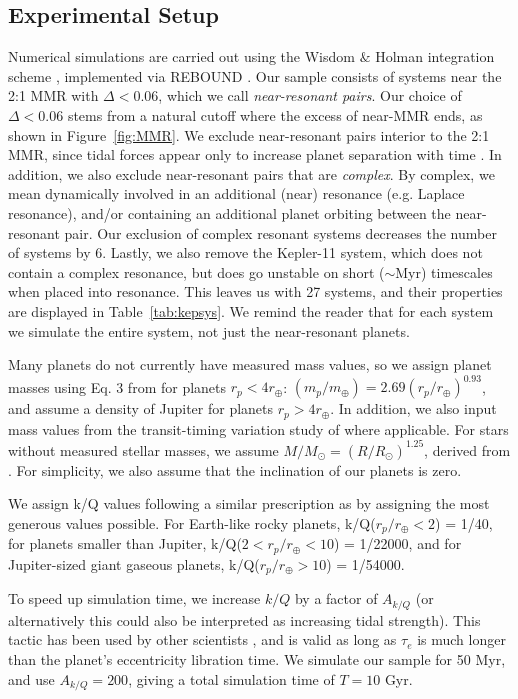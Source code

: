 \subsection{Experimental Setup}
\label{sec:expsetup}
Numerical simulations are carried out using the Wisdom $\& $ Holman integration scheme \citep{Wisdom1991}, implemented via REBOUND \citep{Rein2012}. 
Our sample consists of \kep{} systems near the 2:1 MMR with $\Delta < 0.06$, which we call \textit{near-resonant pairs}.
Our choice of $\Delta < 0.06$ stems from a natural cutoff where the excess of near-MMR ends, as shown in Figure~\ref{fig:MMR}. 
We exclude near-resonant pairs interior to the 2:1 MMR, since tidal forces appear only to increase planet separation with time \citep[e.g.][]{LithwickWu2012}.
In addition, we also exclude near-resonant pairs that are \textit{complex}. 
By complex, we mean dynamically involved in an additional (near) resonance (e.g. Laplace resonance), and/or containing an additional planet orbiting between the near-resonant pair. 
Our exclusion of complex resonant systems decreases the number of \kep{} systems by 6.
Lastly, we also remove the Kepler-11 system, which does not contain a complex resonance, but does go unstable on short ($\sim$Myr) timescales when placed into resonance. 
This leaves us with 27 \kep{} systems, and their properties are displayed in Table~\ref{tab:kepsys}.
We remind the reader that for each \kep{} system we simulate the entire system, not just the near-resonant planets. 

Many \kep{} planets do not currently have measured mass values, so we assign planet masses using Eq. 3 from \citet{Weiss2014} for planets $r_p < 4 r_{\oplus}$:  $(m_p/m_{\oplus}) = 2.69(r_p/r_{\oplus})^{0.93}$, and assume a density of Jupiter for planets $r_p > 4r_{\oplus}$.  
In addition, we also input mass values from the transit-timing variation study of \citet{Hadden2014} where applicable. 
For stars without measured stellar masses, we assume $M/M_{\odot} = (R/R_{\odot})^{1.25}$, derived from \cite{Demircan1991}.
For simplicity, we also assume that the inclination of our \kep{} planets is zero.

We assign k/Q values following a similar prescription as \cite{Lee2013} by assigning the most generous values possible. For Earth-like rocky planets, k/Q($r_p/r_{\oplus} < 2$) = 1/40, for planets smaller than Jupiter, k/Q($2 < r_p/r_{\oplus} < 10$) = 1/22000, and for Jupiter-sized giant gaseous planets, k/Q($r_p/r_{\oplus} > 10$) = 1/54000. 

To speed up simulation time, we increase $k/Q$ by a factor of $A_{k/Q}$ (or alternatively this could also be interpreted as increasing tidal strength). 
This tactic has been used by other scientists \citep[e.g.][]{Delisle2014}, and is valid as long as $\tau_e$ is much longer than the planet's eccentricity libration time.
We simulate our \kep{} sample for 50 Myr, and use $A_{k/Q} = 200$, giving a total simulation time of $T = 10$ Gyr.

